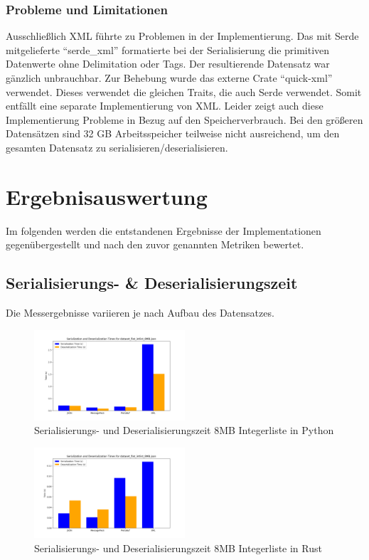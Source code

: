 \documentclass[ngerman]{seminarvorlage}
\begin{document}
\subsubsection{Probleme und Limitationen}

Ausschließlich XML führte zu Problemen in der Implementierung. Das mit Serde mitgelieferte ``serde\_xml'' formatierte bei der Serialisierung die primitiven Datenwerte ohne Delimitation oder Tags. Der resultierende Datensatz war gänzlich unbrauchbar. Zur Behebung wurde das externe Crate ``quick-xml'' verwendet. Dieses verwendet die gleichen Traits, die auch Serde verwendet. Somit entfällt eine separate Implementierung von XML. Leider zeigt auch diese Implementierung Probleme in Bezug auf den Speicherverbrauch. Bei den größeren Datensätzen sind 32 GB Arbeitsspeicher teilweise nicht ausreichend, um den gesamten Datensatz zu serialisieren/deserialisieren.

\section{Ergebnisauswertung}

Im folgenden werden die entstandenen Ergebnisse der Implementationen gegenübergestellt und nach den zuvor genannten Metriken bewertet.

\subsection{Serialisierungs- \& Deserialisierungszeit}

Die Messergebnisse variieren je nach Aufbau des Datensatzes. 

\begin{figure}[h]
  \centering
  \includegraphics[width=0.5\textwidth]{images/graphs/python_dataset_flat_intlist_8MB_json_combined_times.png}
  \caption{Serialisierungs- und Deserialisierungszeit 8MB Integerliste in Python}
  \label{fig:python_serde_8mb_intlist}
\end{figure}

\begin{figure}[h]
  \centering
  \includegraphics[width=0.5\textwidth]{images/graphs/rust_dataset_flat_intlist_8MB_json_combined_times.png}
  \caption{Serialisierungs- und Deserialisierungszeit 8MB Integerliste in Rust}
  \label{fig:rust_serde_8mb_intlist}
\end{figure}
\end{document}
